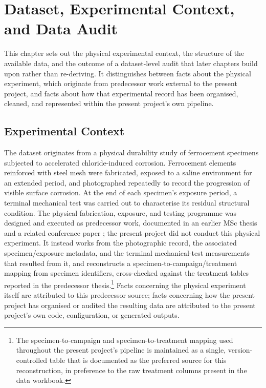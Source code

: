 \chapter{Dataset, Experimental Context, and Data Audit}
\label{ch:dataset}

This chapter sets out the physical experimental context, the structure of
the available data, and the outcome of a dataset-level audit that later
chapters build upon rather than re-deriving. It distinguishes between facts
about the physical experiment, which originate from predecessor work
external to the present project, and facts about how that experimental
record has been organised, cleaned, and represented within the present
project's own pipeline.

\section{Experimental Context}
\label{sec:experimental-context}

The dataset originates from a physical durability study of ferrocement
specimens subjected to accelerated chloride-induced corrosion. Ferrocement
elements reinforced with steel mesh were fabricated, exposed to a saline
environment for an extended period, and photographed repeatedly to record
the progression of visible surface corrosion. At the end of each specimen's
exposure period, a terminal mechanical test was carried out to characterise
its residual structural condition. The physical fabrication, exposure, and
testing programme was designed and executed as predecessor work, documented
in an earlier MSc thesis \citep{hossain_thesis} and a related conference
paper \citep{artiste2025}; the present project did not conduct this physical
experiment. It instead works from the photographic record, the associated
specimen/exposure metadata, and the terminal mechanical-test measurements
that resulted from it, and reconstructs a specimen-to-campaign/treatment
mapping from specimen identifiers, cross-checked against the treatment
tables reported in the predecessor thesis.\footnote{The specimen-to-campaign
and specimen-to-treatment mapping used throughout the present project's
pipeline is maintained as a single, version-controlled table that is
documented as the preferred source for this reconstruction, in preference
to the raw treatment columns present in the data workbook.}
Facts concerning the physical experiment itself are attributed to this
predecessor source; facts concerning how the present project has organised
or audited the resulting data are attributed to the present project's own
code, configuration, or generated outputs.

